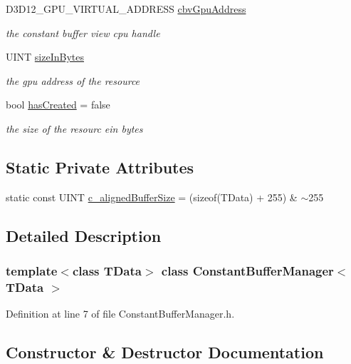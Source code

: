 \begin{DoxyCompactItemize}
D3\+D12\+\_\+\+G\+P\+U\+\_\+\+V\+I\+R\+T\+U\+A\+L\+\_\+\+A\+D\+D\+R\+E\+SS \mbox{\hyperlink{class_constant_buffer_manager_a557ea9cd543fc35337b1e3118fa6356a}{cbv\+Gpu\+Address}}
\begin{DoxyCompactList}\small\item\em the constant buffer view cpu handle \end{DoxyCompactList}\item 
U\+I\+NT \mbox{\hyperlink{class_constant_buffer_manager_a727c8f79fb25e932dbe2034762282d41}{size\+In\+Bytes}}
\begin{DoxyCompactList}\small\item\em the gpu address of the resource \end{DoxyCompactList}\item 
bool \mbox{\hyperlink{class_constant_buffer_manager_aa97b17dea313afa154a39709d3b30d06}{has\+Created}} = false
\begin{DoxyCompactList}\small\item\em the size of the resourc ein bytes \end{DoxyCompactList}\end{DoxyCompactItemize}
\subsection*{Static Private Attributes}
\begin{DoxyCompactItemize}
\item 
static const U\+I\+NT \mbox{\hyperlink{class_constant_buffer_manager_ac646a2089c56b988b2bac5aa9a1de723}{c\+\_\+aligned\+Buffer\+Size}} = (sizeof(T\+Data) + 255) \& $\sim$255
\end{DoxyCompactItemize}


\subsection{Detailed Description}
\subsubsection*{template$<$class T\+Data$>$\newline
class Constant\+Buffer\+Manager$<$ T\+Data $>$}



Definition at line 7 of file Constant\+Buffer\+Manager.\+h.



\subsection{Constructor \& Destructor Documentation}
\mbox{\label{class_constant_buffer_manager_a1b7d5f45ddc84402db2ba342d3e3b277}} 

